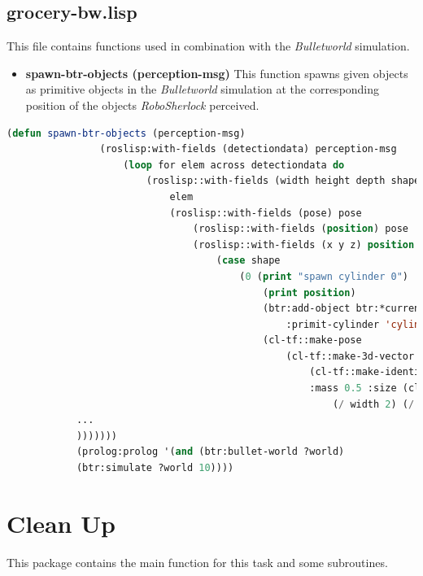 \documentclass[main.tex]{subfiles}
\begin{document}
		\subsection{grocery-bw.lisp}
		This file contains functions used in combination with the \textit{Bulletworld} simulation.
		\begin{itemize}
			\item \textbf{spawn-btr-objects (perception-msg)}
			This function spawns given objects as primitive objects in the \textit{Bulletworld} simulation at the corresponding position of the objects \textit{RoboSherlock} perceived.  
		\end{itemize}
		\begin{lstlisting}[language=lisp]
			(defun spawn-btr-objects (perception-msg)
				(roslisp:with-fields (detectiondata) perception-msg
					(loop for elem across detectiondata do
						(roslisp::with-fields (width height depth shape pose) 
							elem
							(roslisp::with-fields (pose) pose
								(roslisp::with-fields (position) pose
								(roslisp::with-fields (x y z) position 
									(case shape
										(0 (print "spawn cylinder 0")
											(print position)
											(btr:add-object btr:*current-bullet-world* 
												:primit-cylinder 'cylinder-0 
											(cl-tf::make-pose 
												(cl-tf::make-3d-vector x y z)
													(cl-tf::make-identity-rotation))
													:mass 0.5 :size (cl-tf:make-3d-vector 
														(/ width 2) (/ depth 2) (/ height 2))))
			...
			)))))))
			(prolog:prolog '(and (btr:bullet-world ?world)
			(btr:simulate ?world 10))))
		\end{lstlisting}
	  	\section{Clean Up}
	  	\label{clean}
	  	This package contains the main function for this task and some subroutines.
\end{document}
